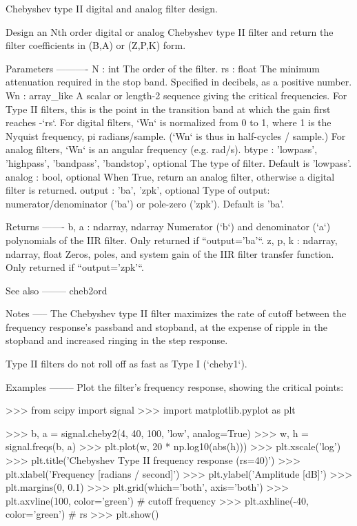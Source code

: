 \begin{DoxyVerb}Chebyshev type II digital and analog filter design.

Design an Nth order digital or analog Chebyshev type II filter and
return the filter coefficients in (B,A) or (Z,P,K) form.

Parameters
----------
N : int
    The order of the filter.
rs : float
    The minimum attenuation required in the stop band.
    Specified in decibels, as a positive number.
Wn : array_like
    A scalar or length-2 sequence giving the critical frequencies.
    For Type II filters, this is the point in the transition band at which
    the gain first reaches -`rs`.
    For digital filters, `Wn` is normalized from 0 to 1, where 1 is the
    Nyquist frequency, pi radians/sample.  (`Wn` is thus in
    half-cycles / sample.)
    For analog filters, `Wn` is an angular frequency (e.g. rad/s).
btype : {'lowpass', 'highpass', 'bandpass', 'bandstop'}, optional
    The type of filter.  Default is 'lowpass'.
analog : bool, optional
    When True, return an analog filter, otherwise a digital filter is
    returned.
output : {'ba', 'zpk'}, optional
    Type of output:  numerator/denominator ('ba') or pole-zero ('zpk').
    Default is 'ba'.

Returns
-------
b, a : ndarray, ndarray
    Numerator (`b`) and denominator (`a`) polynomials of the IIR filter.
    Only returned if ``output='ba'``.
z, p, k : ndarray, ndarray, float
    Zeros, poles, and system gain of the IIR filter transfer
    function.  Only returned if ``output='zpk'``.

See also
--------
cheb2ord

Notes
-----
The Chebyshev type II filter maximizes the rate of cutoff between the
frequency response's passband and stopband, at the expense of ripple in
the stopband and increased ringing in the step response.

Type II filters do not roll off as fast as Type I (`cheby1`).

Examples
--------
Plot the filter's frequency response, showing the critical points:

>>> from scipy import signal
>>> import matplotlib.pyplot as plt

>>> b, a = signal.cheby2(4, 40, 100, 'low', analog=True)
>>> w, h = signal.freqs(b, a)
>>> plt.plot(w, 20 * np.log10(abs(h)))
>>> plt.xscale('log')
>>> plt.title('Chebyshev Type II frequency response (rs=40)')
>>> plt.xlabel('Frequency [radians / second]')
>>> plt.ylabel('Amplitude [dB]')
>>> plt.margins(0, 0.1)
>>> plt.grid(which='both', axis='both')
>>> plt.axvline(100, color='green') # cutoff frequency
>>> plt.axhline(-40, color='green') # rs
>>> plt.show()\end{DoxyVerb}
 \hypertarget{namespacescipy_1_1signal_1_1filter__design_a64dd34b82b73bef6d483bf7c20e4b927}{}
